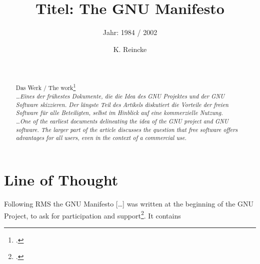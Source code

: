 \documentclass[DIV=calc,BCOR=5mm,11pt,headings=small,oneside,abstract=true, toc=bib]{scrartcl}
\begin{document}

\titlehead{Literaturexzerpt}
\subject{Autor(en): Stallman / Stallman1984a}
\title{Titel: The GNU Manifesto}
\subtitle{Jahr: 1984 / 2002 }
\author{K. Reincke}

\maketitle

\begin{abstract}
\noindent
\cite[(in:)][]{StaGay2002a} \\
\noindent
\cite[(ist:)][]{Stallman1984a} \\
Das Werk / The work\footcite[][]{Stallman1984a} \\
\noindent \itshape
\ldots Eines der frühestes Dokumente, die die Idea des GNU Projektes und der GNU
Software skizzieren. Der längste Teil des Artikels diskutiert die Vorteile der
freien Software für alle Beteiligten, selbst im Hinblick auf eine kommerzielle
Nutzung.
\\
\noindent
\ldots One of the earliest documents delineating the idea of the GNU project and
GNU software. The larger part of the article discusses the question that free
software offers advantages for all users, even in the context of a commercial
use.
\end{abstract}
\footnotesize
\normalsize

\section{Line of Thought}
Following RMS the GNU Manifesto \glqq{}[\ldots] was written at the
beginning of the GNU Project, to ask for participation and
support\grqq{}\footcite[cf.][31]{Stallman1984a}. It contains
\end{document}
